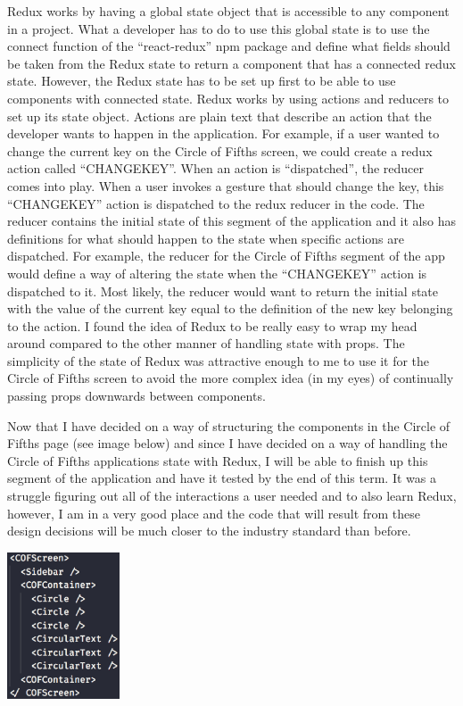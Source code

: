 \documentclass[onecolumn, draftclsnofoot,10pt, compsoc]{IEEEtran}
\begin{document}
Redux works by having a global state object that is accessible to any component in a project.
What a developer has to do to use this global state is to use the connect function of the “react-redux” npm package and define what fields should be taken from the Redux state to return a component that has a connected redux state. 
However, the Redux state has to be set up first to be able to use components with connected state. 
Redux works by using actions and reducers to set up its state object. 
Actions are plain text that describe an action that the developer wants to happen in the application. 
For example, if a user wanted to change the current key on the Circle of Fifths screen, we could create a redux action called ``CHANGEKEY''. 
When an action is “dispatched”, the reducer comes into play. 
When a user invokes a gesture that should change the key, this ``CHANGEKEY'' action is dispatched to the redux reducer in the code. 
The reducer contains the initial state of this segment of the application and it also has definitions for what should happen to the state when specific actions are dispatched. 
For example, the reducer for the Circle of Fifths segment of the app would define a way of altering the state when the ``CHANGEKEY'' action is dispatched to it. 
Most likely, the reducer would want to return the initial state with the value of the current key equal to the definition of the new key belonging to the action. 
I found the idea of Redux to be really easy to wrap my head around compared to the other manner of handling state with props. 
The simplicity of the state of Redux was attractive enough to me to use it for the Circle of Fifths screen to avoid the more complex idea (in my eyes) of continually passing props downwards between components.

Now that I have decided on a way of structuring the components in the Circle of Fifths page (see image below) and since I have decided on a way of handling the Circle of Fifths applications state with Redux, I will be able to finish up this segment of the application and have it tested by the end of this term. 
It was a struggle figuring out all of the interactions a user needed and to also learn Redux, however, I am in a very good place and the code that will result from these design decisions will be much closer to the industry standard than before.

\includegraphics[width=0.25\textwidth]{cof-html}
\end{document}
